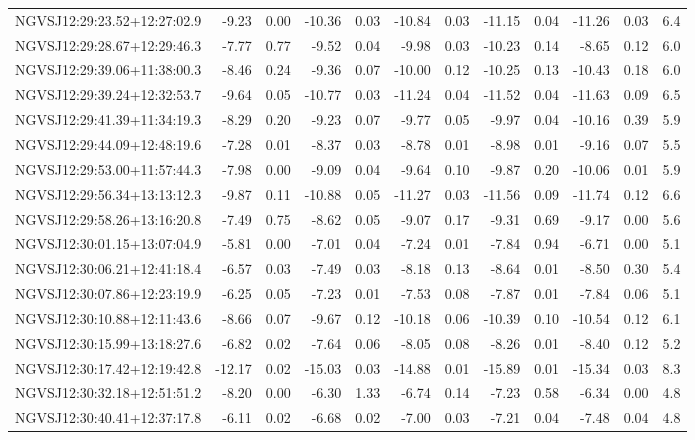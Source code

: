 \begin{tabular}{lrrrrrrrrrrc}
NGVSJ12:29:23.52+12:27:02.9 & -9.23 & 0.00 & -10.36 & 0.03 & -10.84 & 0.03 & -11.15 & 0.04 & -11.26 & 0.03 & 6.4 \\
NGVSJ12:29:28.67+12:29:46.3 & -7.77 & 0.77 & -9.52 & 0.04 & -9.98 & 0.03 & -10.23 & 0.14 & -8.65 & 0.12 & 6.0 \\
NGVSJ12:29:39.06+11:38:00.3 & -8.46 & 0.24 & -9.36 & 0.07 & -10.00 & 0.12 & -10.25 & 0.13 & -10.43 & 0.18 & 6.0 \\
NGVSJ12:29:39.24+12:32:53.7 & -9.64 & 0.05 & -10.77 & 0.03 & -11.24 & 0.04 & -11.52 & 0.04 & -11.63 & 0.09 & 6.5 \\
NGVSJ12:29:41.39+11:34:19.3 & -8.29 & 0.20 & -9.23 & 0.07 & -9.77 & 0.05 & -9.97 & 0.04 & -10.16 & 0.39 & 5.9 \\
NGVSJ12:29:44.09+12:48:19.6 & -7.28 & 0.01 & -8.37 & 0.03 & -8.78 & 0.01 & -8.98 & 0.01 & -9.16 & 0.07 & 5.5 \\
NGVSJ12:29:53.00+11:57:44.3 & -7.98 & 0.00 & -9.09 & 0.04 & -9.64 & 0.10 & -9.87 & 0.20 & -10.06 & 0.01 & 5.9 \\
NGVSJ12:29:56.34+13:13:12.3 & -9.87 & 0.11 & -10.88 & 0.05 & -11.27 & 0.03 & -11.56 & 0.09 & -11.74 & 0.12 & 6.6 \\
NGVSJ12:29:58.26+13:16:20.8 & -7.49 & 0.75 & -8.62 & 0.05 & -9.07 & 0.17 & -9.31 & 0.69 & -9.17 & 0.00 & 5.6 \\
NGVSJ12:30:01.15+13:07:04.9 & -5.81 & 0.00 & -7.01 & 0.04 & -7.24 & 0.01 & -7.84 & 0.94 & -6.71 & 0.00 & 5.1 \\
NGVSJ12:30:06.21+12:41:18.4 & -6.57 & 0.03 & -7.49 & 0.03 & -8.18 & 0.13 & -8.64 & 0.01 & -8.50 & 0.30 & 5.4 \\
NGVSJ12:30:07.86+12:23:19.9 & -6.25 & 0.05 & -7.23 & 0.01 & -7.53 & 0.08 & -7.87 & 0.01 & -7.84 & 0.06 & 5.1 \\
NGVSJ12:30:10.88+12:11:43.6 & -8.66 & 0.07 & -9.67 & 0.12 & -10.18 & 0.06 & -10.39 & 0.10 & -10.54 & 0.12 & 6.1 \\
NGVSJ12:30:15.99+13:18:27.6 & -6.82 & 0.02 & -7.64 & 0.06 & -8.05 & 0.08 & -8.26 & 0.01 & -8.40 & 0.12 & 5.2 \\
NGVSJ12:30:17.42+12:19:42.8 & -12.17 & 0.02 & -15.03 & 0.03 & -14.88 & 0.01 & -15.89 & 0.01 & -15.34 & 0.03 & 8.3 \\
NGVSJ12:30:32.18+12:51:51.2 & -8.20 & 0.00 & -6.30 & 1.33 & -6.74 & 0.14 & -7.23 & 0.58 & -6.34 & 0.00 & 4.8 \\
NGVSJ12:30:40.41+12:37:17.8 & -6.11 & 0.02 & -6.68 & 0.02 & -7.00 & 0.03 & -7.21 & 0.04 & -7.48 & 0.04 & 4.8 \\

\end{tabular}
